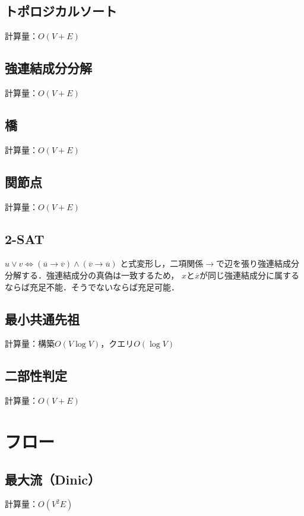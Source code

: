 \documentclass[landscape,twocolumn,9pt]{jsarticle}
\begin{document}
\subsection{トポロジカルソート}
計算量：$O(V+E)$


\subsection{強連結成分分解}
計算量：$O(V+E)$


\subsection{橋}
計算量：$O(V+E)$


\subsection{関節点}
計算量：$O(V+E)$


\subsection{2-SAT}
$u\lor v \Leftrightarrow(\overline u\to\overline v)\land(\overline v\to\overline u)$
と式変形し，二項関係$\to$で辺を張り強連結成分分解する．強連結成分の真偽は一致するため，
$x$と$\overline x$が同じ強連結成分に属するならば充足不能．そうでないならば充足可能．

\subsection{最小共通先祖}
計算量：構築$O(V \log V)$，クエリ$O(\log V)$


\subsection{二部性判定}
計算量：$O(V+E)$


\section{フロー}%
\subsection{最大流（Dinic）}
計算量：$O(V^2E)$

\end{document}
